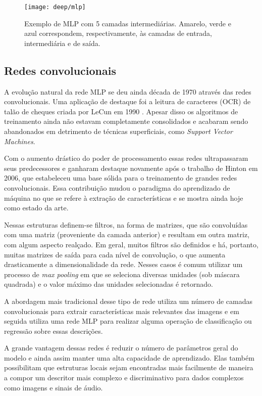 \begin{figure}[h]
\centering
\texttt{[image: deep/mlp]}
\caption{Exemplo de MLP com 5 camadas intermediárias. Amarelo, verde e azul correspondem, respectivamente, às camadas de entrada, intermediária e de saída.}
\label{fig:mlp}
\end{figure}

\subsection{Redes convolucionais}
A evolução natural da rede MLP se deu ainda década de 1970 através das redes convolucionais. Uma aplicação de destaque foi a leitura de caracteres (OCR) de talão de cheques criada por LeCun em 1990 \cite{lecunhandwritten}. Apesar disso os algoritmos de treinamento ainda não estavam completamente consolidados e acabaram sendo abandonados em detrimento de técnicas superficiais, como \textit{Support Vector Machines}.

Com o aumento drástico do poder de processamento essas redes ultrapassaram seus predecessores e ganharam destaque novamente após o trabalho de Hinton \cite{hintonCONVNET} em 2006, que estabeleceu uma base sólida para o treinamento de grandes redes convolucionais. Essa contribuição mudou o paradigma do aprendizado de máquina no que se refere à extração de características e se mostra ainda hoje como estado da arte. 

Nessas estruturas definem-se filtros, na forma de matrizes, que são convoluídas com uma matriz (proveniente da camada anterior) e resultam em outra matriz, com algum aspecto realçado. Em geral, muitos filtros são definidos e há, portanto, muitas matrizes de saída para cada nível de convolução, o que aumenta drasticamente a dimensionalidade da rede. Nesses casos é comum utilizar um processo de \textit{max pooling} em que se seleciona diversas unidades (sob máscara quadrada) e o valor máximo das unidades selecionadas é retornado.

A abordagem mais tradicional desse tipo de rede utiliza um número de camadas convolucionais para extrair características mais relevantes das imagens e em seguida utiliza uma rede MLP para realizar alguma operação de classificação ou regressão sobre essas descrições.

A grande vantagem dessas redes é reduzir o número de parâmetros geral do modelo e ainda assim manter uma alta capacidade de aprendizado. Elas também possibilitam que estruturas locais sejam encontradas mais facilmente de maneira a compor um descritor mais complexo e discriminativo para dados complexos como imagens e sinais de áudio.

